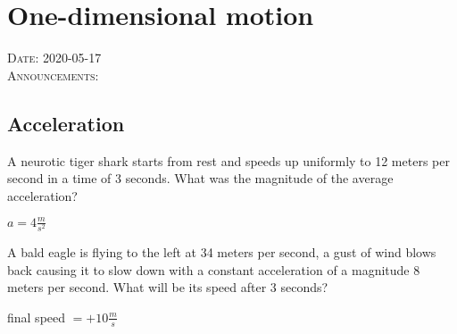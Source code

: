 


\chapter{One-dimensional motion}%
\label{cha:one_dimensional_motion}


\LARGE\textsc{Date: 2020-05-17}
\\
\LARGE\textsc{Announcements:}



\newpage
{}
\section{Acceleration}%
\label{sec:acceleration}


\begin{example}
	A neurotic tiger shark starts from rest and speeds up uniformly to 12 meters per
	second in a time of 3 seconds. What was the magnitude of the average acceleration?
\end{example}

\begin{solution}
	$a = 4 \frac{m}{s^2}$
\end{solution}

\begin{example}
	A bald eagle is flying to the left at 34 meters per second, a
	gust of wind blows back causing it to slow down with a constant
	acceleration of a magnitude 8 meters per second. What will be
	its speed after 3 seconds?
\end{example}

\begin{solution}
	final speed $= +10 \frac{m}{s}$
\end{solution}







\newpage



